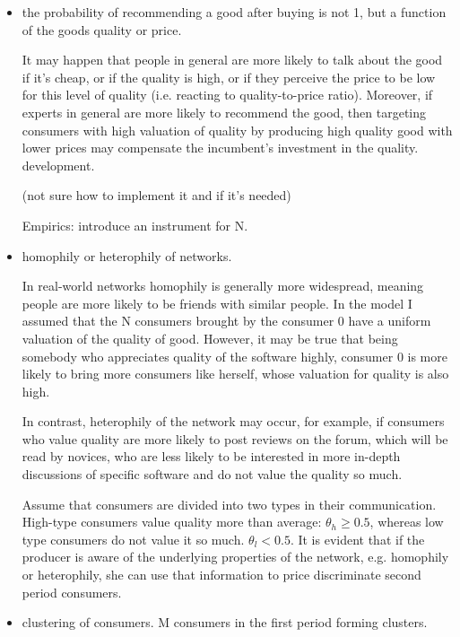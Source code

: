 \documentclass{article}
\numberwithin{figure}{section}
\numberwithin{table}{section}
\theoremstyle{indented}
\numberwithin{equation}{section} %
\begin{document}
\begin{itemize}
    \item the probability of recommending a good after buying is not 1, but a function of the goods quality or price.
    
    It may happen that people in general are more likely to talk about the good if it's cheap, or if the quality is high, or if they perceive the price to be low for this level of quality (i.e. reacting to quality-to-price ratio). Moreover, if experts in general are more likely to recommend the good, then targeting consumers with high valuation of quality by producing high quality good with lower prices may compensate the incumbent's investment in the quality. development.
    
    (not sure how to implement it and if it's needed)
    
    Empirics: introduce an instrument for N.
    
    \item homophily or heterophily of networks.
    
    In real-world networks homophily is generally more widespread, meaning people are more likely to be friends with similar people. In the model I assumed that the N consumers brought by the consumer 0 have a uniform valuation of the quality of good. However, it may be true that being somebody who appreciates quality of the software highly, consumer 0 is more likely to bring more consumers like herself, whose valuation for quality is also high.
    
    In contrast, heterophily of the network may occur, for example, if consumers who value quality are more likely to post reviews on the forum, which will be read by novices, who are less likely to be interested in more in-depth discussions of specific software and do not value the quality so much.
    
    Assume that consumers are divided into two types in their communication. High-type consumers value quality more than average: $\theta_h\geq 0.5$, whereas low type consumers do not value it so much. $\theta_l < 0.5$.  It is evident that if the producer is aware of the underlying properties of the network, e.g. homophily or heterophily, she can use that information to price discriminate second period consumers.  
	\item clustering of consumers.
M consumers in the first period forming clusters.
\end{itemize}



\newpage

\end{document}
